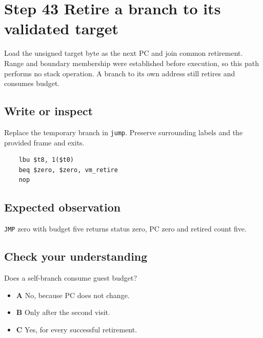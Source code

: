 \section{Step 43 Retire a branch to its validated target}\label{vm-s43}

Load the unsigned target byte as the next PC and join common retirement. Range and boundary membership were established before execution, so this path performs no stack operation. A branch to its own address still retires and consumes budget.

\subsection{Write or inspect}
Replace the temporary branch in \texttt{jump}. Preserve surrounding labels and the provided frame and exits.

\begin{verbatim}
    lbu $t8, 1($t0)
    beq $zero, $zero, vm_retire
    nop
\end{verbatim}
\subsection{Expected observation}
\texttt{JMP} zero with budget five returns status zero, PC zero and retired count five.

\subsection{Check your understanding}
Does a self-branch consume guest budget?

\begin{itemize}
  \item \textbf{A} No, because PC does not change.
  \item \textbf{B} Only after the second visit.
  \item \textbf{C} Yes, for every successful retirement.
\end{itemize}
